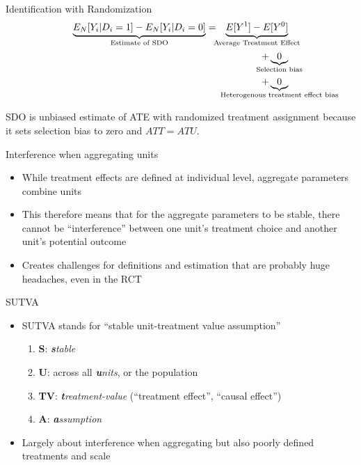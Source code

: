 \documentclass{beamer}
\begin{document}
\begin{frame}[plain]

  \begin{block}{Identification with Randomization}
    \begin{eqnarray*}
      \underbrace{E_N[Y_i | D_i=1] - E_N[Y_i | D_i=0]}_{ \mathclap{\text{Estimate of SDO}}}&=& \underbrace{E[Y^1] - E[Y^0]}_{ \mathclap{\text{Average Treatment Effect}}} \\
    &&+ \underbrace{0}_{ \mathclap{\text{Selection bias}}}  \\
    && + \underbrace{0}_{ \mathclap{\text{Heterogenous treatment effect bias}}}
    \end{eqnarray*}
  \end{block}
  
  SDO is unbiased estimate of ATE with randomized treatment assignment because it sets selection bias to zero and $ATT=ATU$.



\end{frame}



\begin{frame}{Interference when aggregating units}

\begin{itemize}
\item While treatment effects are defined at individual level, aggregate parameters combine units
\item This therefore means that for the aggregate parameters to be stable, there cannot be ``interference'' between one unit's treatment choice and another unit's potential outcome
\item Creates challenges for definitions and estimation that are probably huge headaches, even in the RCT
\end{itemize}

\end{frame}

\begin{frame}{SUTVA}

  \begin{itemize}
    \item SUTVA stands for ``stable unit-treatment value assumption''
          \begin{enumerate}
            \item \textbf{S}: \emph{\textbf{s}table}
            \item \textbf{U}: across all \emph{\textbf{u}nits}, or the population
            \item \textbf{TV}: \emph{\textbf{t}reatment-value} (``treatment effect'', ``causal effect'')
            \item \textbf{A}: \emph{\textbf{a}ssumption}
          \end{enumerate}
    \item Largely about interference when aggregating but also poorly defined treatments and scale
  \end{itemize}
\end{frame}
\end{document}
